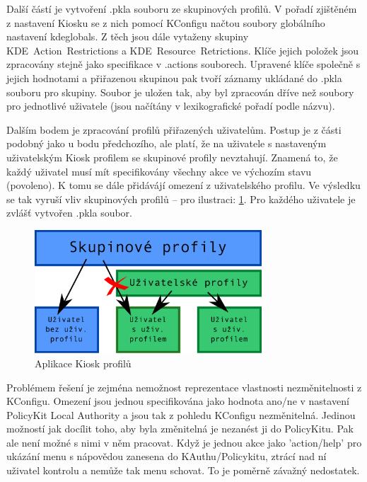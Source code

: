 {Další částí je vytvoření .pkla souboru ze skupinových profilů. V pořadí zjištěném z nastavení Kiosku se z nich pomocí KConfigu načtou soubory globálního nastavení kdeglobals. Z těch jsou dále vytaženy skupiny KDE~Action~Restrictions a KDE~Resource~Retrictions. Klíče jejich položek jsou zpracovány stejně jako specifikace v .actions souborech. Upravené klíče společně s jejich hodnotami a přiřazenou skupinou pak tvoří záznamy ukládané do .pkla souboru pro skupiny. Soubor je uložen tak, aby byl zpracován dříve než soubory pro jednotlivé uživatele (jsou načítány v lexikografické pořadí podle názvu).

Dalším bodem je zpracování profilů přiřazených uživatelům. Postup je z části podobný jako u bodu předchozího, ale platí, že na uživatele s nastaveným uživatelským Kiosk profilem se skupinové profily nevztahují. Znamená to, že každý uživatel musí mít specifikovány všechny akce ve výchozím stavu (povoleno). K tomu se dále přidávájí omezení z uživatelského profilu. Ve výsledku se tak vyruší vliv skupinových profilů -- pro ilustraci: \ref{fig:konv_profily}. Pro každého uživatele je zvlášť vytvořen .pkla soubor.

\begin{figure}[h]
    \centering
    \includegraphics[width=8.5cm]{obrazky/profily.pdf}
    \caption{Aplikace Kiosk profilů}
    \label{fig:konv_profily}
\end{figure}

Problémem řešení je zejména nemožnost reprezentace vlastnosti nezměnitelnosti z KConfigu. Omezení jsou jednou specifikována jako hodnota ano/ne v nastavení PolicyKit Local Authority a jsou tak z pohledu KConfigu nezměnitelná. Jedinou možností jak docílit toho, aby byla změnitelná je nezanést ji do PolicyKitu. Pak ale není možné s nimi v něm pracovat. Když je jednou akce jako 'action/help' pro ukázání menu s nápovědou zanesena do KAuthu/Policykitu, ztrácí nad ní uživatel kontrolu a nemůže tak menu schovat. To je poměrně závažný nedostatek.

}
